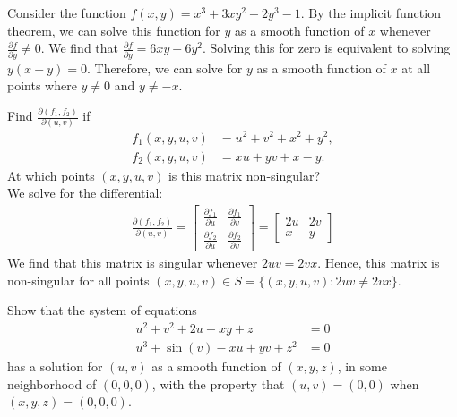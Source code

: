 \documentclass[12pt]{book}
\newenvironment{exercise}[2][Exercise]{\begin{trivlist}
\item[\hskip \labelsep {\bfseries #1}\hskip \labelsep {\bfseries #2.}]}{\end{trivlist}}
\begin{document}
\begin{exercise}{7.2.7}
\begin{exercise}{9.7.1}
Consider the function $f(x,y)=x^3 + 3xy^2+2y^3 -1$. By the implicit function theorem, we can solve this function for $y$ as a smooth function of $x$ whenever $\frac{\partial f}{\partial y}\neq 0$. We find that $\frac{\partial f}{\partial y}= 6xy + 6 y^2$. Solving this for zero is equivalent to solving $y(x+y)=0$.  Therefore, we can solve for $y$ as a smooth function of $x$ at all points where $y \neq 0$ and $y \neq -x$.
\end{exercise}


\begin{exercise}{9.7.3}
    Find $\frac{\partial(f_1,f_2)}{\partial(u,v)}$ if
        \begin{align*}
            f_1(x,y,u,v) &= u^2 + v^2 + x^2 + y^2, \\
            f_2(x,y,u,v) &= xu + yv + x - y.
        \end{align*}
    At which points  $(x,y,u,v)$ is this matrix non-singular?  \\

    We solve for the differential:
    \begin{align*}
        \frac{\partial(f_1, f_2)}{\partial (u,v)} = \begin{bmatrix} \frac{\partial f_1}{\partial u} & \frac{\partial f_1}{\partial v} \\ \frac{\partial f_2}{\partial u} & \frac{\partial f_2}{\partial v} \end{bmatrix} = \begin{bmatrix} 2 u & 2 v \\ x & y \end{bmatrix}
    \end{align*}
    We find that this matrix is singular whenever $2 u v= 2 vx$. Hence, this matrix is non-singular for all points $(x,y,u,v) \in S = \{(x,y,u,v) : 2 u v \neq 2 vx \}$.
\end{exercise}


\begin{exercise}{9.7.4}
    Show that the system of equations
    \begin{align*}
        u^2 + v^2 + 2 u - x y + z &= 0 \\
        u^3 + \sin(v) - x u + yv + z^2 &= 0
    \end{align*}
    has a solution for $(u,v)$ as a smooth function of $(x,y,z)$, in some neighborhood of $(0,0,0)$, with the property that $(u,v) = (0,0)$ when $(x,y,z) = (0,0,0)$.  \\


\end{exercise}
\end{exercise}
\end{document}
